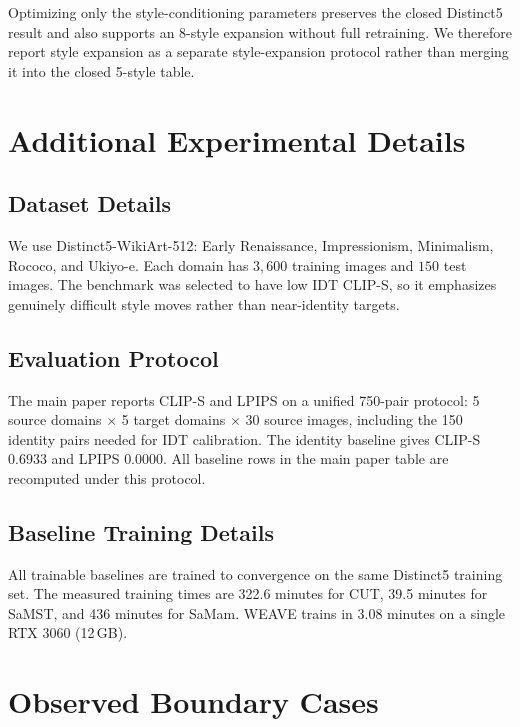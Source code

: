 \documentclass[10pt,letterpaper]{article}
\begin{document}
Optimizing only the style-conditioning parameters preserves the closed Distinct5 result and also supports an 8-style expansion without full retraining. We therefore report style expansion as a separate style-expansion protocol rather than merging it into the closed 5-style table.

\section{Additional Experimental Details}
\label{sec:exp_details}

\subsection{Dataset Details}
\label{sec:dataset}

We use Distinct5-WikiArt-512: Early Renaissance, Impressionism, Minimalism, Rococo, and Ukiyo-e. Each domain has $3{,}600$ training images and $150$ test images. The benchmark was selected to have low IDT CLIP-S, so it emphasizes genuinely difficult style moves rather than near-identity targets.

\subsection{Evaluation Protocol}
\label{sec:eval}

The main paper reports CLIP-S and LPIPS on a unified 750-pair protocol: 5 source domains $\times$ 5 target domains $\times$ 30 source images, including the 150 identity pairs needed for IDT calibration. The identity baseline gives CLIP-S $0.6933$ and LPIPS $0.0000$. All baseline rows in the main paper table are recomputed under this protocol.

\subsection{Baseline Training Details}
\label{sec:baselines}

All trainable baselines are trained to convergence on the same Distinct5 training set. The measured training times are 322.6 minutes for CUT, 39.5 minutes for SaMST, and 436 minutes for SaMam. WEAVE trains in 3.08 minutes on a single RTX 3060 (12\,GB).

\section{Observed Boundary Cases}
\label{sec:failures}
\end{document}
